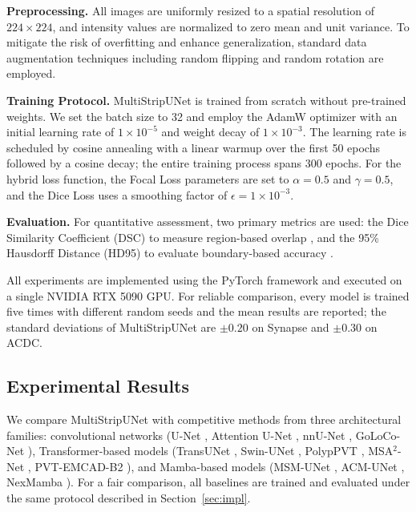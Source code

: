 \documentclass{llncs}
\begin{document}
\textbf{Preprocessing.} All images are uniformly resized to a spatial resolution of $224 \times 224$, and intensity values are normalized to zero mean and unit variance. To mitigate the risk of overfitting and enhance generalization, standard data augmentation techniques including random flipping and random rotation are employed.

\textbf{Training Protocol.} MultiStripUNet is trained from scratch without pre-trained weights. We set the batch size to 32 and employ the AdamW optimizer \cite{loshchilov2017decoupled} with an initial learning rate of $1 \times 10^{-5}$ and weight decay of $1 \times 10^{-3}$. The learning rate is scheduled by cosine annealing \cite{loshchilov2016sgdr} with a linear warmup over the first 50 epochs followed by a cosine decay; the entire training process spans 300 epochs. For the hybrid loss function, the Focal Loss parameters are set to $\alpha = 0.5$ and $\gamma = 0.5$, and the Dice Loss uses a smoothing factor of $\epsilon = 1 \times 10^{-3}$.

\textbf{Evaluation.} For quantitative assessment, two primary metrics are used: the Dice Similarity Coefficient (DSC) to measure region-based overlap \cite{milletari2016v}, and the 95\% Hausdorff Distance (HD95) to evaluate boundary-based accuracy \cite{huttenlocher1993comparing}.

All experiments are implemented using the PyTorch framework and executed on a single NVIDIA RTX 5090 GPU. For reliable comparison, every model is trained five times with different random seeds and the mean results are reported; the standard deviations of MultiStripUNet are $\pm 0.20$ on Synapse and $\pm 0.30$ on ACDC.

\subsection{Experimental Results}

We compare MultiStripUNet with competitive methods from three architectural families: convolutional networks (U-Net \cite{ronneberger2015unet}, Attention U-Net \cite{oktay2018attention}, nnU-Net \cite{isensee2021nnu}, GoLoCo-Net \cite{goloco2026}), Transformer-based models (TransUNet \cite{chen2021transunet}, Swin-UNet \cite{cao2021swinunet}, PolypPVT \cite{dong2021polyp}, MSA$^2$-Net \cite{msa2net2026}, PVT-EMCAD-B2 \cite{emcad2024}), and Mamba-based models (MSM-UNet \cite{msmunet2025}, ACM-UNet \cite{acmunet2025}, NexMamba \cite{nexmamba2026}). For a fair comparison, all baselines are trained and evaluated under the same protocol described in Section~\ref{sec:impl}.
\end{document}
